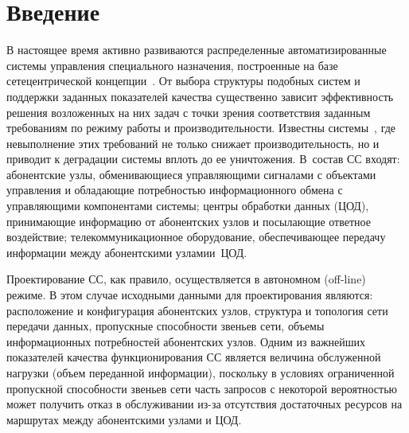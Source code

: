       \begin{multicols}{2}

      \label{st\stat}
        
  \section{Введение}
  
  В настоящее время активно развиваются распределенные 
автоматизированные системы управ\-ле\-ния специального назначения, 
построенные на базе сетецентрической концепции~\cite{1bor}. От выбора 
структуры подобных систем и поддержки заданных показателей качества 
существенно зависит эффективность решения возложенных на них задач с 
точки зрения соответствия заданным требованиям по режиму работы и 
производительности. Известны системы~\cite{2bor}, где невыполнение этих 
требований не только снижает производительность, но и приводит к 
деградации системы вплоть до ее уничтожения. В~состав СС 
входят: абонентские узлы, обменивающиеся управляющими 
сигналами с объектами управления и обладающие потребностью 
информационного обмена с управляющими компонентами системы; центры 
обработки данных (ЦОД), при\-нимающие информацию от абонентских узлов и\linebreak 
по\-сылающие ответное воздействие; телекомму\-ни\-кационное обору\-до\-ва\-ние, 
обеспечивающее передачу информации между абонентскими узлами\linebreak и~ЦОД.
  
  Проектирование СС, как правило, осуществляется в автономном (off-line) 
режиме. В этом случае исходными данными для проектирования являются: 
расположение и конфигурация абонентских узлов, структура и топология сети 
передачи данных, пропускные способности звеньев сети, объемы 
информационных потребностей абонентских узлов. Одним из важнейших 
показателей качества функционирования СС является величина обслуженной 
нагрузки (объем переданной информации), поскольку в условиях ограниченной 
пропускной способности звеньев сети часть запросов с некоторой 
вероятностью может получить отказ в обслуживании из-за отсутствия 
достаточных ресурсов на маршрутах между абонентскими узлами и ЦОД.
  

\end{multicols}
